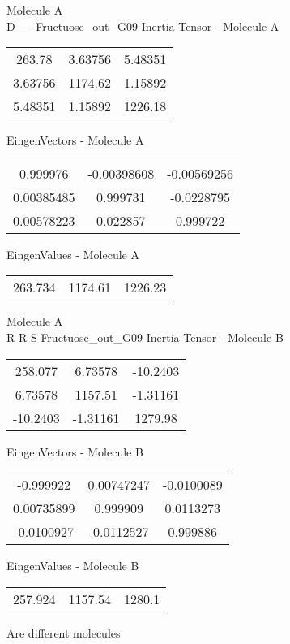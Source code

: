 \newpage
\begin{multicols}{2}
\begin{center}
Molecule A \\ 
D_-_Fructuose_out_G09
Inertia Tensor - Molecule A \\
\vtab
\begin{tabular}{|c c c|}
263.78	 & 	3.63756	 & 	5.48351	 \\
3.63756	 & 	1174.62	 & 	1.15892	 \\
5.48351	 & 	1.15892	 & 	1226.18
\end{tabular}

\vtab
 EingenVectors - Molecule A     \\
\vtab
\begin{tabular}{|c c c|}
0.999976	 & 	-0.00398608	 & 	-0.00569256	 \\
0.00385485	 & 	0.999731	 & 	-0.0228795	 \\
0.00578223	 & 	0.022857	 & 	0.999722
\end{tabular}

\vtab
 EingenValues - Molecule A     \\
\vtab
\begin{tabular}{|c c c|}
263.734	 & 	1174.61	 & 	1226.23
\end{tabular}
\columnbreak
Molecule A \\ 
R-R-S-Fructuose_out_G09
Inertia Tensor - Molecule B \\
\vtab
\begin{tabular}{|c c c|}
258.077	 & 	6.73578	 & 	-10.2403	 \\
6.73578	 & 	1157.51	 & 	-1.31161	 \\
-10.2403	 & 	-1.31161	 & 	1279.98
\end{tabular}

\vtab
 EingenVectors - Molecule B     \\
\vtab
\begin{tabular}{|c c c|}
-0.999922	 & 	0.00747247	 & 	-0.0100089	 \\
0.00735899	 & 	0.999909	 & 	0.0113273	 \\
-0.0100927	 & 	-0.0112527	 & 	0.999886
\end{tabular}

\vtab
 EingenValues - Molecule B     \\
\vtab
\begin{tabular}{|c c c|}
257.924	 & 	1157.54	 & 	1280.1
\end{tabular}
\textcolor{NavyBlue}{\large Are different molecules}
\end{center}
\end{multicols}
